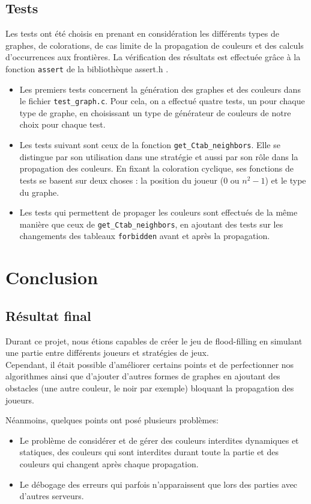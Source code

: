\documentclass[11pt]{article}
\begin{document}
\subsection{Tests}
Les tests ont été choisis en prenant en considération les différents types de graphes, de colorations, de cas limite de la propagation de couleurs et des calculs d'occurrences aux frontières. La vérification des résultats est effectuée grâce à la fonction \texttt{assert} de la bibliothèque assert.h .
\begin{itemize}
\item Les premiers tests concernent la génération des graphes et des couleurs dans le fichier \texttt{test\_graph.c}. Pour cela, on a effectué quatre tests, un pour chaque type de graphe, en choisissant un type de générateur de couleurs de notre choix pour chaque test.

\item Les tests suivant sont ceux de la fonction \texttt{get\_Ctab\_neighbors}. Elle se distingue par son utilisation dans une stratégie et aussi par son rôle dans la propagation des couleurs. En fixant la coloration cyclique, ses fonctions de tests se basent sur deux choses : la position du joueur (0 ou $n^{2}-1$) et le type du graphe.

\item Les tests qui permettent de propager les couleurs sont effectués de la même manière que ceux de \texttt{get\_Ctab\_neighbors}, en ajoutant des tests sur les changements des tableaux \texttt{forbidden} avant et après la propagation.
\end{itemize}

\section{Conclusion}
\subsection{Résultat final}
Durant ce projet, nous étions capables de créer le jeu de flood-filling en simulant une partie entre différents joueurs et stratégies de jeux.\\
Cependant, il était possible d'améliorer certains points et de perfectionner nos algorithmes ainsi que d'ajouter d'autres formes de graphes en ajoutant des obstacles (une autre couleur, le noir par exemple) bloquant la propagation des joueurs.

Néanmoins, quelques points ont posé plusieurs problèmes:
\begin{itemize}
\item Le problème de considérer et de gérer des couleurs interdites dynamiques et statiques, des couleurs qui sont interdites durant toute la partie et des couleurs qui changent après chaque propagation.
\item Le débogage des erreurs qui parfois n'apparaissent que lors des parties avec d'autres serveurs.
\end{itemize}
\end{document}
